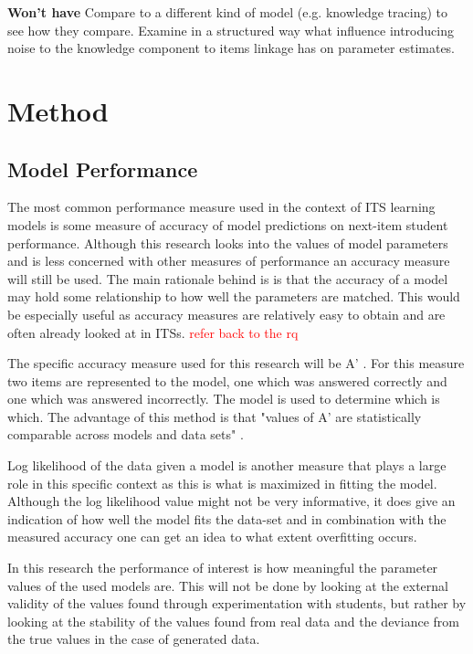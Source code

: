 \documentclass{scrartcl}
\newcommand\todo[1]{\textcolor{red}{#1}}
\begin{document}
{\bf Won't have} Compare to a different kind of model (e.g. knowledge tracing) to see how they compare. Examine in a structured way what influence introducing noise to the knowledge component to items linkage has on parameter estimates.

\section{Method}


\subsection{Model Performance}

\label{sec:perf}
The most common performance measure used in the context of ITS learning models is some measure of accuracy of model predictions on next-item student performance. Although this research looks into the values of model parameters and is less concerned with other measures of performance an accuracy measure will still be used. The main rationale behind is is that the accuracy of a model may hold some relationship to how well the parameters are matched. This would be especially useful as accuracy measures are relatively easy to obtain and are often already looked at in ITSs. \todo{refer back to the rq}

The specific accuracy measure used for this research will be A' \cite{modelreview}. For this measure two items are represented to the model, one which was answered correctly and one which was answered incorrectly. The model is used to determine which is which. The advantage of this method is that "values of A' are statistically comparable across models and data sets" \cite{modelreview}.

Log likelihood of the data given a model is another measure that plays a large role in this specific context as this is what is maximized in fitting the model. Although the log likelihood value might not be very informative, it does give an indication of how well the model fits the data-set and in combination with the measured accuracy one can get an idea to what extent overfitting occurs.

In this research the performance of interest is how meaningful the parameter values of the used models are. This will not be done by looking at the external validity of the values found through experimentation with students, but rather by looking at the stability of the values found from real data and the deviance from the true values in the case of generated data.
\end{document}
